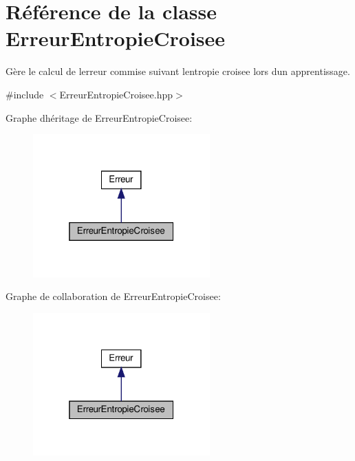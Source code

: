 \hypertarget{classErreurEntropieCroisee}{}\section{Référence de la classe Erreur\+Entropie\+Croisee}
\label{classErreurEntropieCroisee}


Gère le calcul de l\textquotesingle{}erreur commise suivant l\textquotesingle{}entropie croisee lors d\textquotesingle{}un apprentissage.  




{\ttfamily \#include $<$Erreur\+Entropie\+Croisee.\+hpp$>$}



Graphe d\textquotesingle{}héritage de Erreur\+Entropie\+Croisee\+:
\nopagebreak
\begin{figure}[H]
\begin{center}
\leavevmode
\includegraphics[width=193pt]{classErreurEntropieCroisee__inherit__graph}
\end{center}
\end{figure}


Graphe de collaboration de Erreur\+Entropie\+Croisee\+:
\nopagebreak
\begin{figure}[H]
\begin{center}
\leavevmode
\includegraphics[width=193pt]{classErreurEntropieCroisee__coll__graph}
\end{center}
\end{figure}
